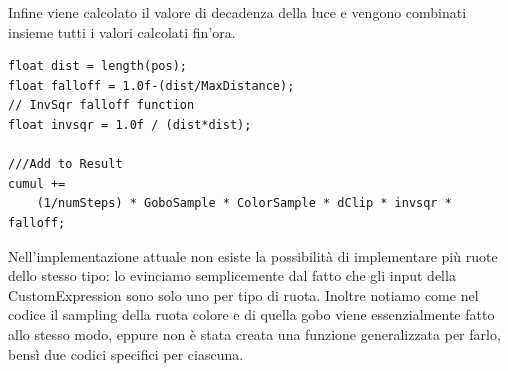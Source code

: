 \documentclass[main.tex]{subfiles}
\begin{document}
Infine viene calcolato il valore di decadenza della luce e vengono combinati insieme tutti i valori calcolati fin'ora.
\begin{lstlisting}
float dist = length(pos);
float falloff = 1.0f-(dist/MaxDistance);
// InvSqr falloff function
float invsqr = 1.0f / (dist*dist);

///Add to Result
cumul +=
    (1/numSteps) * GoboSample * ColorSample * dClip * invsqr * falloff;
\end{lstlisting}

Nell'implementazione attuale non esiste la possibilità di implementare più ruote dello stesso tipo: lo evinciamo semplicemente dal fatto che gli input della CustomExpression sono solo uno per tipo di ruota. Inoltre notiamo come nel codice il sampling della ruota colore e di quella gobo viene essenzialmente fatto allo stesso modo, eppure non è stata creata una funzione generalizzata per farlo, bensì due codici specifici per ciascuna. 
\end{document}

